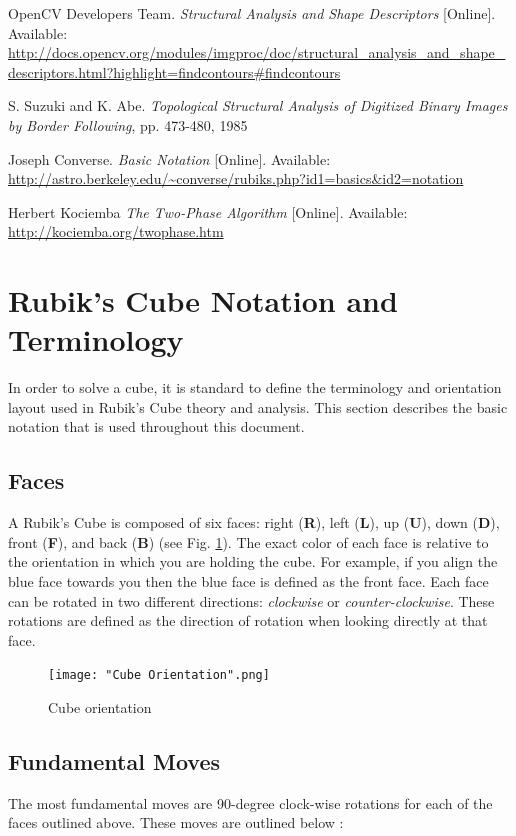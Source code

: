 \documentclass[final, letterpaper, 10 pt, conference, onecolumn]{IEEEtran}
\begin{document}
\begin{thebibliography}{9}
OpenCV Developers Team.
\emph{Structural Analysis and Shape Descriptors}
[Online]. Available: \url{http://docs.opencv.org/modules/imgproc/doc/structural_analysis_and_shape_descriptors.html?highlight=findcontours#findcontours}

S. Suzuki and K. Abe.
\emph{Topological Structural Analysis of Digitized Binary Images by Border Following},
pp. 473-480, 1985

Joseph Converse.
\emph{Basic Notation}
[Online]. Available: \url{http://astro.berkeley.edu/~converse/rubiks.php?id1=basics&id2=notation}

Herbert Kociemba
\emph{The Two-Phase Algorithm}
[Online]. Available: \url{http://kociemba.org/twophase.htm}
\end{thebibliography}

\appendix
\section{Rubik's Cube Notation and Terminology}
\label{sec:Appendix A}
In order to solve a cube, it is standard to define the terminology and orientation layout used in Rubik's Cube theory and analysis. This section describes the basic notation that is used throughout this document.

\subsection{Faces}
A Rubik's Cube is composed of six faces: right (\textbf{R}), left (\textbf{L}), up (\textbf{U}), down (\textbf{D}), front (\textbf{F}), and back (\textbf{B}) (see Fig. \ref{fig:Cube Orientation}). The exact color of each face is relative to the orientation in which you are holding the cube. For example, if you align the blue face towards you then the blue face is defined as the front face. Each face can be rotated in two different directions: \textit{clockwise} or \textit{counter-clockwise}. These rotations are defined as the direction of rotation when looking directly at that face.

\begin{figure}[!hb]
\centering
\texttt{[image: "Cube Orientation".png]}
\caption{Cube orientation}
\label{fig:Cube Orientation}
\end{figure}

\subsection{Fundamental Moves}
\label{sec:fundamental moves}
The most fundamental moves are 90-degree clock-wise rotations for each of the faces outlined above. These moves are outlined below \cite{Basic Cube Notation}:
\end{document}
